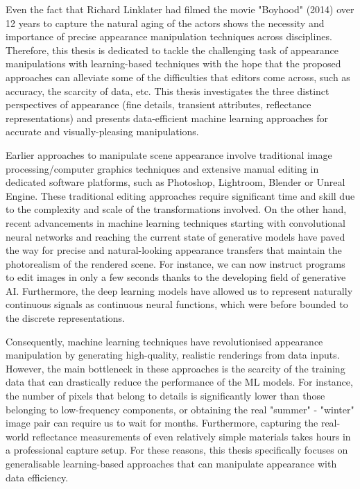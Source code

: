 Even the fact that Richard Linklater had filmed the movie "Boyhood" (2014) over 12 years to capture the natural aging of the actors shows the necessity and importance of precise appearance manipulation techniques across disciplines. Therefore, this thesis is dedicated to tackle the challenging task of appearance manipulations with learning-based techniques with the hope that the proposed approaches can alleviate some of the difficulties that editors come across, such as accuracy, the scarcity of data, etc. This thesis investigates the three distinct perspectives of appearance (fine details, transient attributes, reflectance representations) and presents data-efficient machine learning approaches for accurate and visually-pleasing manipulations.

Earlier approaches to manipulate scene appearance involve traditional image processing/computer graphics techniques and extensive manual editing in dedicated software platforms, such as Photoshop, Lightroom, Blender or Unreal Engine. These traditional editing approaches require significant time and skill due to the complexity and scale of the transformations involved. On the other hand, recent advancements in machine learning techniques starting with convolutional neural networks and reaching the current state of generative models have paved the way for precise and natural-looking appearance transfers that maintain the photorealism of the rendered scene. For instance, we can now instruct programs to edit images in only a few seconds thanks to the developing field of generative AI. Furthermore, the deep learning models have allowed us to represent naturally continuous signals as continuous neural functions, which were before bounded to the discrete representations. 

Consequently, machine learning techniques have revolutionised appearance manipulation by generating high-quality, realistic renderings from data inputs. However, the main bottleneck in these approaches is the scarcity of the training data that can drastically reduce the performance of the ML models. For instance, the number of pixels that belong to details is significantly lower than those belonging to low-frequency components, or obtaining the real "summer" - "winter" image pair can require us to wait for months. Furthermore, capturing the real-world reflectance measurements of even relatively simple materials takes hours in a professional capture setup. For these reasons, this thesis specifically focuses on generalisable learning-based approaches that can manipulate appearance with data efficiency.

